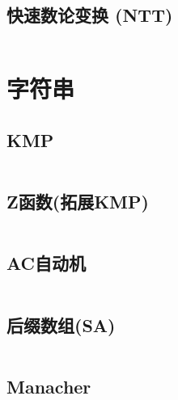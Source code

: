 \documentclass[twoside]{article}
\begin{document}
\subsection{快速数论变换 (NTT)}
\inputminted[breaklines, frame=single]{c++}{../algo/数学/NTT.cpp}

\section{字符串}

\subsection{KMP}
\inputminted[breaklines, frame=single]{c++}{../algo/字符串/KMP.cpp}

\subsection{Z函数(拓展KMP)}
\inputminted[breaklines, frame=single]{c++}{../algo/字符串/Z函数.cpp}


\subsection{AC自动机}
\inputminted[breaklines, frame=single]{c++}{../algo/字符串/AC自动机.cpp}


\subsection{后缀数组(SA)}
\inputminted[breaklines, frame=single]{c++}{../algo/字符串/SA.cpp}

\subsection{Manacher}
\inputminted[breaklines, frame=single]{c++}{../algo/字符串/manacher.cpp}


\end{document}
